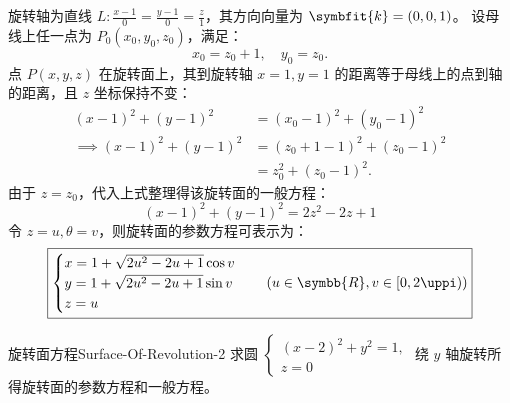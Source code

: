 \begin{solution}
    旋转轴为直线 $L: \frac{x-1}{0} = \frac{y-1}{0} = \frac{z}{1}$，其方向向量为 $\symbfit{k} = (0, 0, 1)$。
    设母线上任一点为 $P_0(x_0, y_0, z_0)$，满足：
    \begin{equation}
        x_0 = z_0 + 1, \quad y_0 = z_0.
    \end{equation}
    点 $P(x, y, z)$ 在旋转面上，其到旋转轴 $x=1, y=1$ 的距离等于母线上的点到轴的距离，且 $z$ 坐标保持不变：
    \begin{equation}
        \begin{aligned}
            (x - 1)^2 + (y - 1)^2          & = (x_0 - 1)^2 + (y_0 - 1)^2     \\
            \implies (x - 1)^2 + (y - 1)^2 & = (z_0 + 1 - 1)^2 + (z_0 - 1)^2 \\
                                           & = z_0^2 + (z_0 - 1)^2.
        \end{aligned}
    \end{equation}
    由于 $z = z_0$，代入上式整理得该旋转面的一般方程：
    \begin{equation}
        \boxed{(x - 1)^2 + (y - 1)^2 = 2z^2 - 2z + 1}
    \end{equation}
    令 $z = u, \theta = v$，则旋转面的参数方程可表示为：
    \begin{equation}
        \boxed{\begin{cases}
            x = 1 + \sqrt{2u^2 - 2u + 1} \cos v \\
            y = 1 + \sqrt{2u^2 - 2u + 1} \sin v \\
            z = u
        \end{cases} \quad (u \in \symbb{R}, v \in [0, 2\uppi))}
    \end{equation}
\end{solution}


\begin{problem}{旋转面方程}{Surface-Of-Revolution-2}
    求圆 $\begin{cases} (x - 2)^2 + y^2 = 1, \\ z = 0 \end{cases}$ 绕 $y$ 轴旋转所得旋转面的参数方程和一般方程。
\end{problem}

